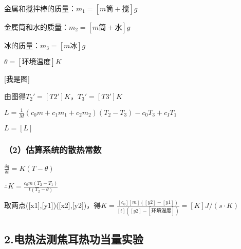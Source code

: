 \documentclass[11pt,a4paper,oneside]{article}
\begin{document}
金属和搅拌棒的质量：$m_1 = [m筒+搅]g$

金属筒和水的质量：$m_2 = [m筒+水]g$

冰的质量：$m_3 = [m冰]g$

$\theta = [环境温度]K$

[我是图]

由图得$T_2' = [T2']K$，$T_3' = [T3']K$

$L = \displaystyle\frac{1}{M}(c_0m+c_1m_1+c_2m_2)(T_2-T_3)-c_0T_3+c_IT_1$

$L = [L]$

\subsubsection{（2）估算系统的散热常数}
$\displaystyle\frac{\delta q}{\delta t} = K(T-\theta )$

$\therefore K = \displaystyle\frac{c_0m(T_2-T_1)}{t(T_2 - \theta)}$

取两点([x1],[y1])([x2],[y2])，得$K = \displaystyle\frac{[c_0][m]([y2]-[y1])}{[t]([y2] - [环境温度])} = [K]J/(s\cdot K)$

\subsection{2.电热法测焦耳热功当量实验}
\end{document}
